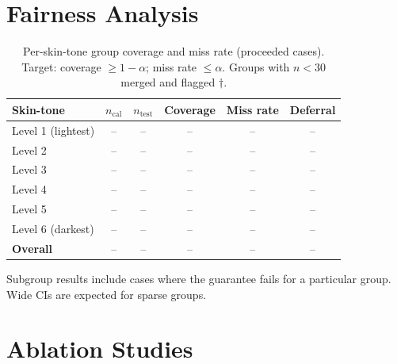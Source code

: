 \documentclass[conference]{IEEEtran}
\newcommand{\1}{\mathbf{1}}
\begin{document}
\section{Fairness Analysis}
\label{sec:fairness}

\begin{table}[H]
  \centering
  \caption{%
    Per-skin-tone group coverage and miss rate (proceeded cases).
    Target: coverage $\geq 1-\alpha$; miss rate $\leq \alpha$.
    Groups with $n<30$ merged and flagged $\dagger$.
  }
  \label{tab:fairness}
  \renewcommand{\arraystretch}{1.2}
  \small
  \begin{tabular}{lccccc}
    \toprule
    \textbf{Skin-tone}
      & \textbf{$n_{\text{cal}}$}
      & \textbf{$n_{\text{test}}$}
      & \textbf{Coverage}
      & \textbf{Miss rate}
      & \textbf{Deferral} \\
    \midrule
    Level 1 (lightest) & -- & -- & -- & -- & -- \\
    Level 2            & -- & -- & -- & -- & -- \\
    Level 3            & -- & -- & -- & -- & -- \\
    Level 4            & -- & -- & -- & -- & -- \\
    Level 5            & -- & -- & -- & -- & -- \\
    Level 6 (darkest)  & -- & -- & -- & -- & -- \\
    \midrule
    \textbf{Overall}   & -- & -- & -- & -- & -- \\
    \bottomrule
  \end{tabular}
\end{table}

Subgroup results include cases where the guarantee fails for a particular
group. Wide CIs are expected for sparse groups.

\section{Ablation Studies}
\label{sec:ablations}
\end{document}
